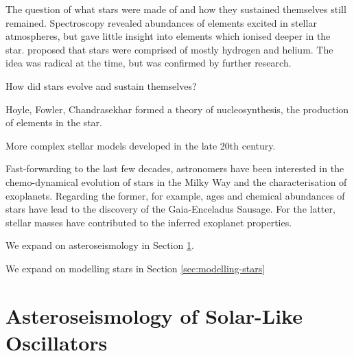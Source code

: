 
The question of what stars were made of and how they sustained themselves still remained. Spectroscopy revealed abundances of elements excited in stellar atmospheres, but gave little insight into elements which ionised deeper in the star. \citet{Payne1925} proposed that stars were comprised of mostly hydrogen and helium. The idea was radical at the time, but was confirmed by further research. 

How did stars evolve and sustain themselves?

Hoyle, Fowler, Chandrasekhar formed a theory of nucleosynthesis, the production of elements in the star.

More complex stellar models developed in the late 20th century.

Fast-forwarding to the last few decades, astronomers have been interested in the chemo-dynamical evolution of stars in the Milky Way and the characterisation of exoplanets. Regarding the former, for example, ages and chemical abundances of stars have lead to the discovery of the Gaia-Enceladus Sausage. For the latter, stellar masses have contributed to the inferred exoplanet properties.

We expand on asteroseismology in Section \ref{sec:seismo}.

We expand on modelling stars in Section \ref{sec:modelling-stars}



\section[Solar-Like Oscillators]{Asteroseismology of Solar-Like Oscillators}\label{sec:seismo}

